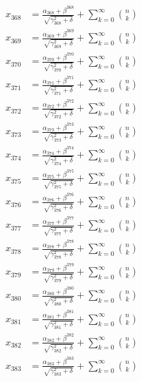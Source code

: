 \documentclass{article}
\begin{document}
\begin{align}
  x_{368} &= \frac{\alpha_{368} + \beta^{368}}{\sqrt{\gamma_{368}^2 + \delta}} + \sum_{k=0}^{\infty} \binom{n}{k} \label{eq:368} \\
  x_{369} &= \frac{\alpha_{369} + \beta^{369}}{\sqrt{\gamma_{369}^2 + \delta}} + \sum_{k=0}^{\infty} \binom{n}{k} \label{eq:369} \\
  x_{370} &= \frac{\alpha_{370} + \beta^{370}}{\sqrt{\gamma_{370}^2 + \delta}} + \sum_{k=0}^{\infty} \binom{n}{k} \label{eq:370} \\
  x_{371} &= \frac{\alpha_{371} + \beta^{371}}{\sqrt{\gamma_{371}^2 + \delta}} + \sum_{k=0}^{\infty} \binom{n}{k} \label{eq:371} \\
  x_{372} &= \frac{\alpha_{372} + \beta^{372}}{\sqrt{\gamma_{372}^2 + \delta}} + \sum_{k=0}^{\infty} \binom{n}{k} \label{eq:372} \\
  x_{373} &= \frac{\alpha_{373} + \beta^{373}}{\sqrt{\gamma_{373}^2 + \delta}} + \sum_{k=0}^{\infty} \binom{n}{k} \label{eq:373} \\
  x_{374} &= \frac{\alpha_{374} + \beta^{374}}{\sqrt{\gamma_{374}^2 + \delta}} + \sum_{k=0}^{\infty} \binom{n}{k} \label{eq:374} \\
  x_{375} &= \frac{\alpha_{375} + \beta^{375}}{\sqrt{\gamma_{375}^2 + \delta}} + \sum_{k=0}^{\infty} \binom{n}{k} \label{eq:375} \\
  x_{376} &= \frac{\alpha_{376} + \beta^{376}}{\sqrt{\gamma_{376}^2 + \delta}} + \sum_{k=0}^{\infty} \binom{n}{k} \label{eq:376} \\
  x_{377} &= \frac{\alpha_{377} + \beta^{377}}{\sqrt{\gamma_{377}^2 + \delta}} + \sum_{k=0}^{\infty} \binom{n}{k} \label{eq:377} \\
  x_{378} &= \frac{\alpha_{378} + \beta^{378}}{\sqrt{\gamma_{378}^2 + \delta}} + \sum_{k=0}^{\infty} \binom{n}{k} \label{eq:378} \\
  x_{379} &= \frac{\alpha_{379} + \beta^{379}}{\sqrt{\gamma_{379}^2 + \delta}} + \sum_{k=0}^{\infty} \binom{n}{k} \label{eq:379} \\
  x_{380} &= \frac{\alpha_{380} + \beta^{380}}{\sqrt{\gamma_{380}^2 + \delta}} + \sum_{k=0}^{\infty} \binom{n}{k} \label{eq:380} \\
  x_{381} &= \frac{\alpha_{381} + \beta^{381}}{\sqrt{\gamma_{381}^2 + \delta}} + \sum_{k=0}^{\infty} \binom{n}{k} \label{eq:381} \\
  x_{382} &= \frac{\alpha_{382} + \beta^{382}}{\sqrt{\gamma_{382}^2 + \delta}} + \sum_{k=0}^{\infty} \binom{n}{k} \label{eq:382} \\
  x_{383} &= \frac{\alpha_{383} + \beta^{383}}{\sqrt{\gamma_{383}^2 + \delta}} + \sum_{k=0}^{\infty} \binom{n}{k} \label{eq:383} \\

\end{align}
\end{document}
